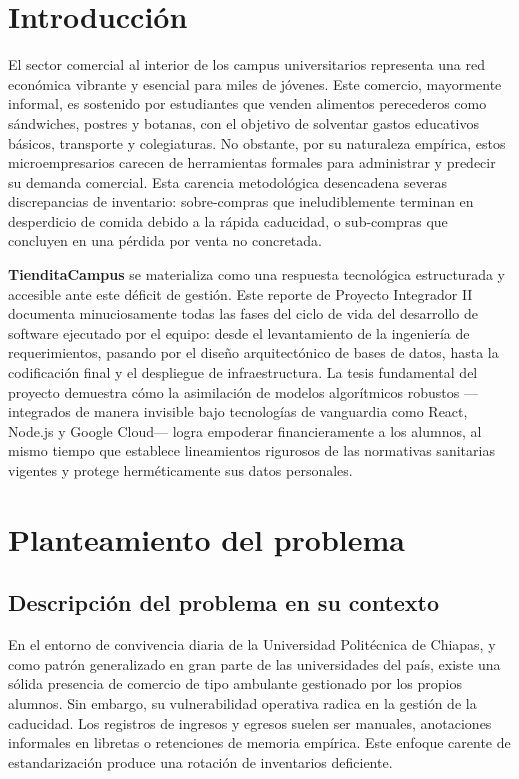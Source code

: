 \documentclass[12pt, a4paper]{article}
\begin{document}
\section{Introducción}
El sector comercial al interior de los campus universitarios representa una red económica vibrante y esencial para miles de jóvenes. Este comercio, mayormente informal, es sostenido por estudiantes que venden alimentos perecederos como sándwiches, postres y botanas, con el objetivo de solventar gastos educativos básicos, transporte y colegiaturas. No obstante, por su naturaleza empírica, estos microempresarios carecen de herramientas formales para administrar y predecir su demanda comercial. Esta carencia metodológica desencadena severas discrepancias de inventario: sobre-compras que ineludiblemente terminan en desperdicio de comida debido a la rápida caducidad, o sub-compras que concluyen en una pérdida por venta no concretada.

\textbf{TienditaCampus} se materializa como una respuesta tecnológica estructurada y accesible ante este déficit de gestión. Este reporte de Proyecto Integrador II documenta minuciosamente todas las fases del ciclo de vida del desarrollo de software ejecutado por el equipo: desde el levantamiento de la ingeniería de requerimientos, pasando por el diseño arquitectónico de bases de datos, hasta la codificación final y el despliegue de infraestructura. La tesis fundamental del proyecto demuestra cómo la asimilación de modelos algorítmicos robustos ---integrados de manera invisible bajo tecnologías de vanguardia como React, Node.js y Google Cloud--- logra empoderar financieramente a los alumnos, al mismo tiempo que establece lineamientos rigurosos de las normativas sanitarias vigentes y protege herméticamente sus datos personales.

\section{Planteamiento del problema}

\subsection{Descripción del problema en su contexto}
En el entorno de convivencia diaria de la Universidad Politécnica de Chiapas, y como patrón generalizado en gran parte de las universidades del país, existe una sólida presencia de comercio de tipo ambulante gestionado por los propios alumnos. Sin embargo, su vulnerabilidad operativa radica en la gestión de la caducidad. Los registros de ingresos y egresos suelen ser manuales, anotaciones informales en libretas o retenciones de memoria empírica. Este enfoque carente de estandarización produce una rotación de inventarios deficiente.
\end{document}
